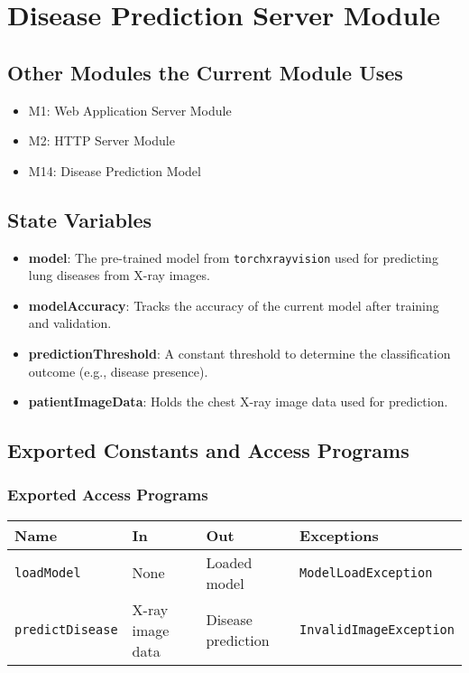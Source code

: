 \documentclass[12pt, titlepage]{article}
\begin{document}
\section{Disease Prediction Server Module}

\subsection{Other Modules the Current Module Uses}
\begin{itemize}
    \item M1: Web Application Server Module
    \item M2: HTTP Server Module
    \item M14: Disease Prediction Model
\end{itemize}

\subsection{State Variables}
\begin{itemize}
    \item \textbf{model}: The pre-trained model from \texttt{torchxrayvision} used for predicting lung diseases from X-ray images.
    \item \textbf{modelAccuracy}: Tracks the accuracy of the current model after training and validation.
    \item \textbf{predictionThreshold}: A constant threshold to determine the classification outcome (e.g., disease presence).
    \item \textbf{patientImageData}: Holds the chest X-ray image data used for prediction.
\end{itemize}

\subsection{Exported Constants and Access Programs}
\subsubsection{Exported Access Programs}
\begin{tabular}{|l|l|l|l|}
    \hline
    \textbf{Name} & \textbf{In} & \textbf{Out} & \textbf{Exceptions} \\
    \hline
    \texttt{loadModel} & None & Loaded model & \texttt{ModelLoadException} \\
    \texttt{predictDisease} & X-ray image data & Disease prediction & \texttt{InvalidImageException} \\
    \hline
\end{tabular}
\end{document}
